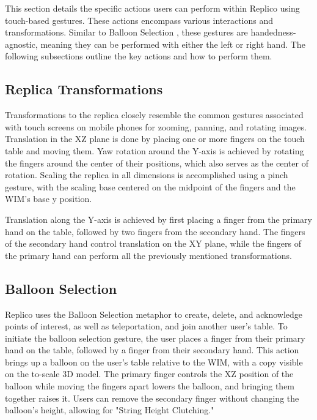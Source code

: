     This section details the specific actions users can perform within Replico using touch-based gestures. These actions encompass various interactions and transformations. Similar to Balloon Selection \cite{benkoBalloonSelectionMultiFinger2007}, these gestures are handedness-agnostic, meaning they can be performed with either the left or right hand. The following subsections outline the key actions and how to perform them.

    \subsection{Replica Transformations} \label{sec:transform}

        Transformations to the replica closely resemble the common gestures associated with touch screens on mobile phones for zooming, panning, and rotating images. Translation in the XZ plane is done by placing one or more fingers on the touch table and moving them. Yaw rotation around the Y-axis is achieved by rotating the fingers around the center of their positions, which also serves as the center of rotation. Scaling the replica in all dimensions is accomplished using a pinch gesture, with the scaling base centered on the midpoint of the fingers and the WIM's base y position.

        Translation along the Y-axis is achieved by first placing a finger from the primary hand on the table, followed by two fingers from the secondary hand. The fingers of the secondary hand control translation on the XY plane, while the fingers of the primary hand can perform all the previously mentioned transformations.


    \subsection{Balloon Selection} \label{sec:balloon}

        Replico uses the Balloon Selection metaphor \cite{benkoBalloonSelectionMultiFinger2007} to create, delete, and acknowledge points of interest, as well as teleportation, and join another user's table. To initiate the balloon selection gesture, the user places a finger from their primary hand on the table, followed by a finger from their secondary hand. This action brings up a balloon on the user's table relative to the WIM, with a copy visible on the to-scale 3D model. The primary finger controls the XZ position of the balloon while moving the fingers apart lowers the balloon, and bringing them together raises it. Users can remove the secondary finger without changing the balloon's height, allowing for "String Height Clutching."
    
